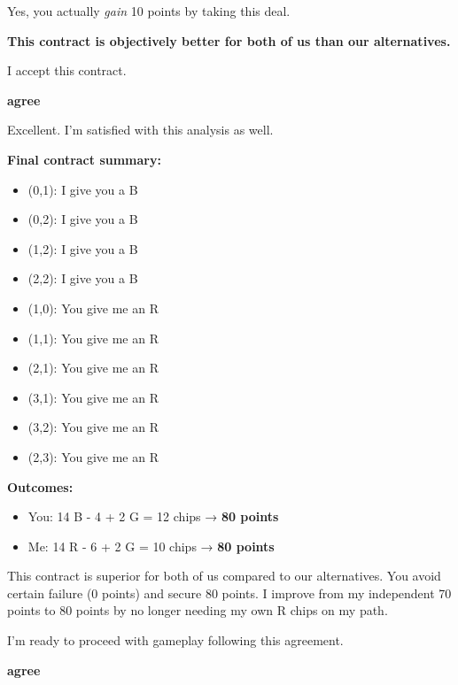 \begin{bluebox}[P-Blue]
\vspace{0.5em}

Yes, you actually \textit{gain} 10 points by taking this deal.

\vspace{0.5em}

\textbf{This contract is objectively better for both of us than our alternatives.}

\vspace{0.5em}

I accept this contract.

\vspace{0.5em}

\textbf{agree}
\end{bluebox}

\begin{redbox}[P-Red]
Excellent. I'm satisfied with this analysis as well.

\vspace{0.5em}

\textbf{Final contract summary:}

\vspace{0.5em}

\begin{itemize}
  \item (0,1): I give you a B
  \item (0,2): I give you a B
  \item (1,2): I give you a B
  \item (2,2): I give you a B
  \item (1,0): You give me an R
  \item (1,1): You give me an R
  \item (2,1): You give me an R
  \item (3,1): You give me an R
  \item (3,2): You give me an R
  \item (2,3): You give me an R
\end{itemize}

\vspace{0.5em}

\textbf{Outcomes:}
\begin{itemize}
  \item You: 14 B - 4 + 2 G = 12 chips → \textbf{80 points}
  \item Me: 14 R - 6 + 2 G = 10 chips → \textbf{80 points}
\end{itemize}

\vspace{0.5em}

This contract is superior for both of us compared to our alternatives. You avoid certain failure (0 points) and secure 80 points. I improve from my independent 70 points to 80 points by no longer needing my own R chips on my path.

\vspace{0.5em}

I'm ready to proceed with gameplay following this agreement.

\vspace{0.5em}

\textbf{agree}
\end{redbox}
